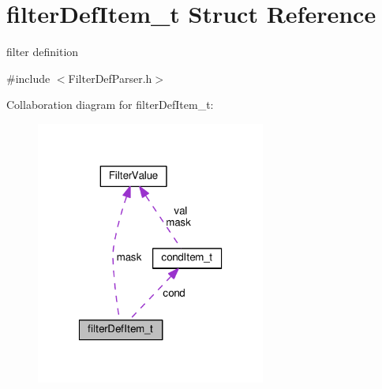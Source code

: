 \hypertarget{structfilterDefItem__t}{}\section{filter\+Def\+Item\+\_\+t Struct Reference}
\label{structfilterDefItem__t}


filter definition  




{\ttfamily \#include $<$Filter\+Def\+Parser.\+h$>$}



Collaboration diagram for filter\+Def\+Item\+\_\+t\+:
\nopagebreak
\begin{figure}[H]
\begin{center}
\leavevmode
\includegraphics[width=214pt]{structfilterDefItem__t__coll__graph}
\end{center}
\end{figure}

